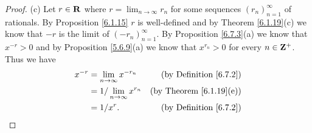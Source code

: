 \begin{proof}{(c)}
    Let \(r \in \mathbf{R}\) where \(r = \lim_{n \to \infty} r_n\) for some sequences \((r_n)_{n = 1}^\infty\) of rationals.
    By Proposition \ref{6.1.15} \(r\) is well-defined and by Theorem \ref{6.1.19}(c) we know that \(-r\) is the limit of \((-r_n)_{n = 1}^\infty\).
    By Proposition \ref{6.7.3}(a) we know that \(x^{-r} > 0\) and by Proposition \ref{5.6.9}(a) we know that \(x^{r_n} > 0\) for every \(n \in \mathbf{Z}^+\).
    Thus we have
    \begin{align*}
        x^{-r} & = \lim_{n \to \infty} x^{-r_n}    & \text{(by Definition \ref{6.7.2})}  \\
               & = 1 / \lim_{n \to \infty} x^{r_n} & \text{(by Theorem \ref{6.1.19}(e))} \\
               & = 1 / x^r.                        & \text{(by Definition \ref{6.7.2})}
    \end{align*}
\end{proof}

